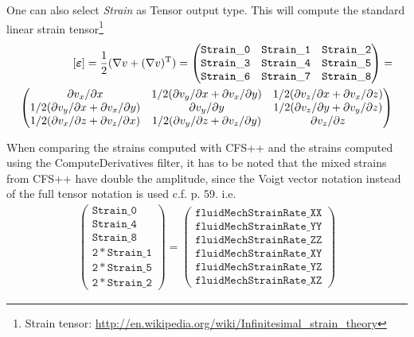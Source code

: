One can also select {\it Strain} as Tensor output type. This will compute the standard linear strain tensor\footnote{Strain tensor: \url{http://en.wikipedia.org/wiki/Infinitesimal\_strain\_theory}}
\begin{align}
\nonumber
  [\boldsymbol{\varepsilon}] = \frac{1}{2}(\nabla v + (\nabla v)^{\rm T}) = 
 \begin{pmatrix} 
    \mathtt{Strain\_0} & \mathtt{Strain\_1} & \mathtt{Strain\_2}\\
    \mathtt{Strain\_3} & \mathtt{Strain\_4} & \mathtt{Strain\_5}\\
    \mathtt{Strain\_6} & \mathtt{Strain\_7} & \mathtt{Strain\_8}
  \end{pmatrix} = \\
\nonumber
 \begin{pmatrix} 
    \partial v_x / \partial x & 1/2 (\partial v_y / \partial x + \partial v_x / \partial y) & 1/2 (\partial v_z / \partial x + \partial v_x / \partial z)\\
    1/2 (\partial v_y / \partial x + \partial v_x / \partial y) & \partial v_y / \partial y & 1/2 (\partial v_z / \partial y + \partial v_y / \partial z)\\
    1/2 (\partial v_x / \partial z + \partial v_z / \partial x) & 1/2 (\partial v_y / \partial z + \partial v_z / \partial y) & \partial v_z / \partial z
  \end{pmatrix}
\end{align}%

When comparing the strains computed with CFS++ and the strains computed using the ComputeDerivatives filter, it has to be
noted that the mixed strains from CFS++ have double the amplitude, since the Voigt vector notation instead of the full 
tensor notation is used c.f. \cite{Kaltenbacher2007} p. 59. i.e.
\begin{align}
\nonumber
 \begin{pmatrix} 
    \mathtt{Strain\_0} \\
    \mathtt{Strain\_4} \\
    \mathtt{Strain\_8} \\
    \mathtt{2 * Strain\_1} \\
    \mathtt{2 * Strain\_5} \\
    \mathtt{2 * Strain\_2}
  \end{pmatrix} = 
 \begin{pmatrix} 
    \mathtt{fluidMechStrainRate\_XX} \\
    \mathtt{fluidMechStrainRate\_YY} \\
    \mathtt{fluidMechStrainRate\_ZZ} \\
    \mathtt{fluidMechStrainRate\_XY} \\
    \mathtt{fluidMechStrainRate\_YZ} \\
    \mathtt{fluidMechStrainRate\_XZ}
  \end{pmatrix} 
\end{align}%

